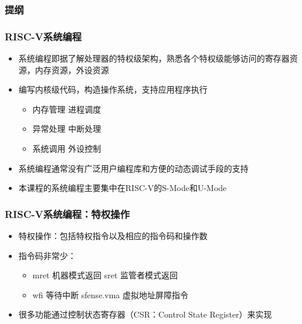 \begin{frame}
    \frametitle{提纲} 
    \tableofcontents 
\end{frame}

\begin{frame}
    \frametitle{RISC-V系统编程}
    \begin{itemize}
        \item 系统编程即据了解处理器的特权级架构，熟悉各个特权级能够访问的寄存器资源，内存资源，外设资源        
        \item 编写内核级代码，构造操作系统，支持应用程序执行
        \begin{itemize}
            \item 内存管理 \quad 进程调度
            \item 异常处理 \quad 中断处理
            \item 系统调用 \quad 外设控制
        \end{itemize}				
        \item 系统编程通常没有广泛用户编程库和方便的动态调试手段的支持
        \item 本课程的系统编程主要集中在RISC-V的S-Mode和U-Mode
    \end{itemize}
    
\end{frame}


\begin{frame}
    \frametitle{RISC-V系统编程：特权操作}
    \begin{itemize}
        \item 特权操作：包括特权指令以及相应的指令码和操作数       
        \item 指令码非常少：
        \begin{itemize}
            \item mret 机器模式返回 \quad sret 监管者模式返回
            \item wfi 等待中断 \quad \quad \quad \quad sfense.vma 虚拟地址屏障指令
        \end{itemize}				
        \item 很多功能通过控制状态寄存器（CSR：Control State Register）来实现
    \end{itemize}
    
\end{frame}

